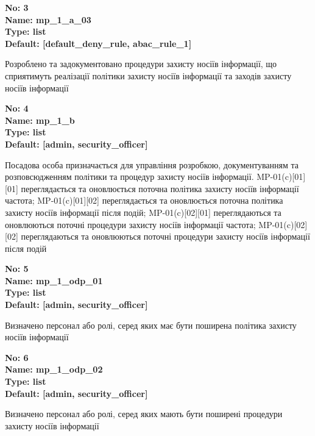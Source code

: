 \documentclass{article}
\begin{document}
{\footnotesize\bfseries
No: 3\\
Name: mp\_\allowbreak{}1\_\allowbreak{}a\_\allowbreak{}03\\
Type: list\\
Default: [\textquotedbl{}default\_\allowbreak{}deny\_\allowbreak{}rule\textquotedbl{}, \textquotedbl{}abac\_\allowbreak{}rule\_\allowbreak{}1\textquotedbl{}]
}

{\footnotesize Розроблено та задокументовано процедури захисту носіїв інформації, що сприятимуть реалізації політики захисту носіїв інформації та заходів захисту носіїв інформації}


{\footnotesize\bfseries
No: 4\\
Name: mp\_\allowbreak{}1\_\allowbreak{}b\\
Type: list\\
Default: [\textquotedbl{}admin\textquotedbl{}, \textquotedbl{}security\_\allowbreak{}officer\textquotedbl{}]
}

{\footnotesize Посадова особа призначається для управління розробкою, документуванням та розповсюдженням політики та процедур захисту носіїв інформації. MP-01(c)[01][01] переглядається та оновлюється поточна політика захисту носіїв інформації частота; MP-01(c)[01][02] переглядається та оновлюється поточна політика захисту носіїв інформації після подій; MP-01(c)[02][01] переглядаються та оновлюються поточні процедури захисту носіїв інформації частота; MP-01(c)[02][02] переглядаються та оновлюються поточні процедури захисту носіїв інформації після подій}


{\footnotesize\bfseries
No: 5\\
Name: mp\_\allowbreak{}1\_\allowbreak{}odp\_\allowbreak{}01\\
Type: list\\
Default: [\textquotedbl{}admin\textquotedbl{}, \textquotedbl{}security\_\allowbreak{}officer\textquotedbl{}]
}

{\footnotesize Визначено персонал або ролі, серед яких має бути поширена політика захисту носіїв інформації}


{\footnotesize\bfseries
No: 6\\
Name: mp\_\allowbreak{}1\_\allowbreak{}odp\_\allowbreak{}02\\
Type: list\\
Default: [\textquotedbl{}admin\textquotedbl{}, \textquotedbl{}security\_\allowbreak{}officer\textquotedbl{}]
}

{\footnotesize Визначено персонал або ролі, серед яких мають бути поширені процедури захисту носіїв інформації}
\end{document}
